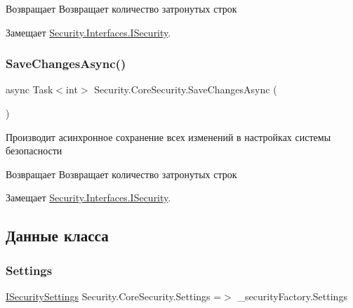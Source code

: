 \begin{DoxyReturn}{Возвращает}
Возвращает количество затронутых строк
\end{DoxyReturn}


Замещает \hyperlink{interface_security_1_1_interfaces_1_1_i_security_ac2cb6f1d06c0684886c94ed6ed88e7da}{Security.\+Interfaces.\+I\+Security}.

\mbox{\label{class_security_1_1_core_security_ac1c356b6ee81025a45d145512dfd41b7}} 
\subsubsection{\texorpdfstring{Save\+Changes\+Async()}{SaveChangesAsync()}}
{\footnotesize\ttfamily async Task$<$int$>$ Security.\+Core\+Security.\+Save\+Changes\+Async (\begin{DoxyParamCaption}{ }\end{DoxyParamCaption})}



Производит асинхронное сохранение всех изменений в настройках системы безопасности 

\begin{DoxyReturn}{Возвращает}
Возвращает количество затронутых строк
\end{DoxyReturn}


Замещает \hyperlink{interface_security_1_1_interfaces_1_1_i_security_a73465b9b858b22e2ec8497f903c8f49b}{Security.\+Interfaces.\+I\+Security}.



\subsection{Данные класса}
\mbox{\label{class_security_1_1_core_security_a93562c3f6277d8462f88e25d8c6b097d}} 
\subsubsection{\texorpdfstring{Settings}{Settings}}
{\footnotesize\ttfamily \hyperlink{interface_security_1_1_interfaces_1_1_i_security_settings}{I\+Security\+Settings} Security.\+Core\+Security.\+Settings =$>$ \+\_\+security\+Factory.\+Settings}



